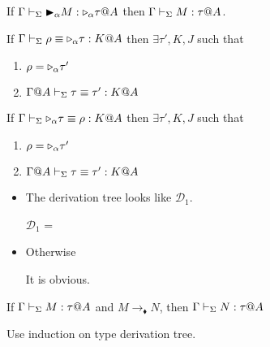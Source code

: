 \begin{lemma}
	\begin{item}
	      \item If $\G \V \TB_\alpha M : \TW_\alpha \tau@A$ then $\Gamma \vdash_\Sigma M : \tau @A$.
	      \item If $\Gamma \vdash_\Sigma \rho \equiv  {\mathop{\triangleright}}_\alpha \tau : K @A$ then $\exists \tau', K, J$ such that
	      \begin{enumerate}
		      \item $\rho = {\mathop{\triangleright}}_\alpha \tau'$
		      \item $\Gamma @A\vdash_\Sigma \tau \equiv \tau' : K @A$
	      \end{enumerate}
	      \item If $\Gamma \vdash_\Sigma {\mathop{\triangleright}}_\alpha \tau \equiv \rho : K @A$ then $\exists \tau', K, J$ such that
	      \begin{enumerate}
		      \item $\rho = {\mathop{\triangleright}}_\alpha \tau'$
		      \item $\Gamma @A\vdash_\Sigma \tau \equiv \tau' : K @A$
	      \end{enumerate}
	\end{item}
\end{lemma}

\begin{itemize}
	\item \TTB

	      The derivation tree looks like $\mathcal{D}_1$.

	      $\mathcal{D}_1$ = 
	      {}

	\item Otherwise

	      It is obvious.

\end{itemize}

\begin{theorem}
	If $\G\V M:\tau@A$ and $M\longrightarrow_\blacklozenge N$, then $\G\V N:\tau@A$\\
\end{theorem}

Use induction on type derivation tree.

